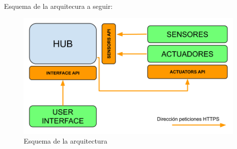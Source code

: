 Esquema de la arquitecura a seguir:
\begin{figure}[H]
\centering
\includegraphics[width=6.00in]{images/esquema_arquitectura.png}
\caption{Esquema de la arquitectura}
\label{fig:esquema_arquitectura}
\end{figure}

